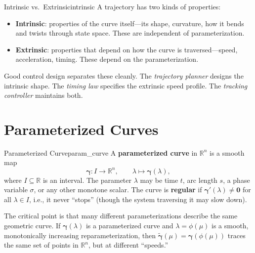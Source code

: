 \documentclass[12pt, openany]{book}
\theoremstyle{plain}
\newcommand{\traj}{\bm{\gamma}}
\newcommand{\Reals}{\mathbb{R}}
\begin{document}
\begin{keyidea}{Intrinsic vs.\ Extrinsic}{intrinsic}
  A trajectory has two kinds of properties:
  \begin{itemize}[leftmargin=1cm]
    \item \textbf{Intrinsic}: properties of the curve itself---its shape,
      curvature, how it bends and twists through state space. These are
      independent of parameterization.
    \item \textbf{Extrinsic}: properties that depend on how the curve is
      traversed---speed, acceleration, timing. These depend on the
      parameterization.
  \end{itemize}
  Good control design separates these cleanly. The \emph{trajectory planner}
  designs the intrinsic shape. The \emph{timing law} specifies the extrinsic
  speed profile. The \emph{tracking controller} maintains both.
\end{keyidea}

\section{Parameterized Curves}

\begin{definition}{Parameterized Curve}{param_curve}
  A \textbf{parameterized curve} in $\Reals^n$ is a smooth map
  \begin{equation}
    \traj: I \to \Reals^n, \qquad \lambda \mapsto \traj(\lambda),
  \end{equation}
  where $I \subseteq \Reals$ is an interval. The parameter $\lambda$ may be time $t$,
  arc length $s$, a phase variable $\sigma$, or any other monotone scalar.
  The curve is \textbf{regular} if $\traj'(\lambda) \neq \bm{0}$ for all
  $\lambda \in I$, i.e., it never ``stops'' (though the system traversing it may
  slow down).
\end{definition}

The critical point is that many different parameterizations describe the same
geometric curve. If $\traj(\lambda)$ is a parameterized curve and
$\lambda = \phi(\mu)$ is a smooth, monotonically increasing reparameterization,
then $\tilde{\traj}(\mu) = \traj(\phi(\mu))$ traces the same set of points in
$\Reals^n$, but at different ``speeds.''
\end{document}
